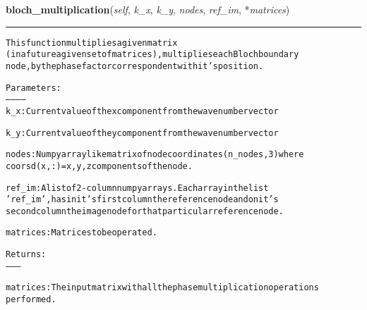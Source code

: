 \hspace{.8\funcindent}\begin{boxedminipage}{\funcwidth}

    \raggedright \textbf{bloch\_multiplication}(\textit{self}, \textit{k\_x}, \textit{k\_y}, \textit{nodes}, \textit{ref\_im}, *\textit{matrices})

    \vspace{-1.5ex}

    \rule{\textwidth}{0.5\fboxrule}
\setlength{\parskip}{2ex}
\begin{alltt}

This function multiplies a given matrix 
(in a future a given set of matrices), multiplies each Bloch boundary 
node, by the phase factor correspondent with it's position.

Parameters:
-----------
k\_x:       Current value of the x component from the wavenumber vector
 
k\_y:       Current value of the y component from the wavenumber vector

nodes:     Numpy array like matrix of node coordinates (n\_nodes,3) where 
       coorsd(x,:)= x,y,z components of the node.

ref\_im:    A list of 2-column numpy arrays. Each array in the list 
       'ref\_im', has in it's first column the reference node and on it's 
       second column the image node for that particular reference node.

matrices:  Matrices to be operated.

Returns:
--------

matrices:  The input matrix with all the phase multiplication operations 
       performed.
\end{alltt}

\setlength{\parskip}{1ex}
    \end{boxedminipage}

    \label{Classes:Boundaries:bloch_sum}

    \vspace{0.5ex}

